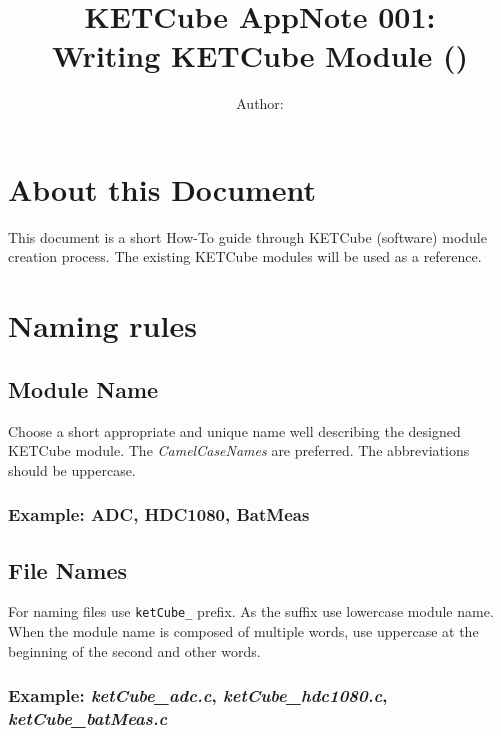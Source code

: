 \documentclass[twoside,a4paper]{refart}
\title{\UWBLogo KETCube AppNote 001:\\ Writing KETCube Module (\vhCurrentVersion)}
\author{Author: \vhListAllAuthors}
\begin{document}

\titlepage
\maketitle

\section*{About this Document}


This document is a short How-To guide through KETCube (software) module creation process. The existing KETCube modules will be used as a reference.


\setcounter{tocdepth}{1}
\tableofcontents
\clearpage

\listoffigures
\listoftables
\begin{versionhistory}
\end{versionhistory}
\setcounter{table}{0}

\clearpage 
{} 
\pagestyle{headings} 

\clearpage
\section{Naming rules}
\subsection*{Module Name}
Choose a short appropriate and unique name well describing the designed KETCube module. The {\it CamelCaseNames} are preferred. The abbreviations should be uppercase.
\subsubsection*{Example: ADC, HDC1080, BatMeas}

\subsection*{File Names}
For naming files use {\tt ketCube\_} prefix. As the suffix use lowercase module name. When the module name is composed of multiple words, use uppercase at the beginning of the second and other words.
\subsubsection*{Example: {\it ketCube\_adc.c}, {\it ketCube\_hdc1080.c}, {\it ketCube\_batMeas.c}}
\end{document}
